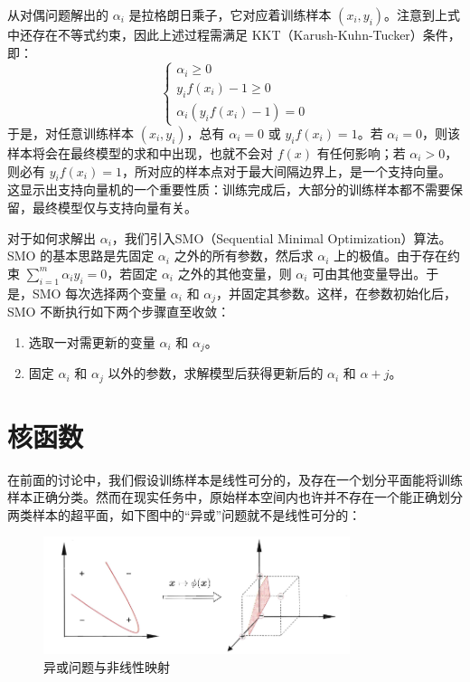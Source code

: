 \documentclass[12pt, a4paper]{article} %
\begin{document}
从对偶问题解出的 $\alpha_i$ 是拉格朗日乘子，它对应着训练样本 $(x_i, y_i)$。注意到上式中还存在不等式约束，因此上述过程需满足 KKT（Karush-Kuhn-Tucker）条件，即：
\begin{equation*}
    \left\{\begin{matrix}
    \alpha_i \ge 0  \\
    y_i f(x_i) - 1 \ge 0 \\
    \alpha_i (y_i f(x_i) - 1) = 0
    \end{matrix}\right.
\end{equation*}
于是，对任意训练样本 $(x_i, y_i)$，总有 $\alpha_i = 0$ 或 $y_i f(x_i) = 1$。若 $\alpha_i = 0$，则该样本将会在最终模型的求和中出现，也就不会对 $f(x)$ 有任何影响；若 $\alpha_i > 0$，则必有 $y_i f(x_i) = 1$，所对应的样本点对于最大间隔边界上，是一个支持向量。这显示出支持向量机的一个重要性质：训练完成后，大部分的训练样本都不需要保留，最终模型仅与支持向量有关。

对于如何求解出 $\alpha_i$，我们引入SMO（Sequential Minimal Optimization）算法。SMO 的基本思路是先固定 $\alpha_i$ 之外的所有参数，然后求 $\alpha_i$ 上的极值。由于存在约束 $\displaystyle \sum_{i = 1}^{m} \alpha_i y_i = 0$，若固定 $\alpha_i$ 之外的其他变量，则 $\alpha_i$ 可由其他变量导出。于是，SMO 每次选择两个变量 $\alpha_i$ 和 $\alpha_j$，并固定其参数。这样，在参数初始化后，SMO 不断执行如下两个步骤直至收敛：
\begin{enumerate}[\hspace*{2em} i.]
    \item 选取一对需更新的变量 $\alpha_i$ 和 $\alpha_j$。
    \item 固定 $\alpha_i$ 和 $\alpha_j$ 以外的参数，求解模型后获得更新后的 $\alpha_i$ 和 $\alpha+j$。
\end{enumerate}

\section{核函数}

在前面的讨论中，我们假设训练样本是线性可分的，及存在一个划分平面能将训练样本正确分类。然而在现实任务中，原始样本空间内也许并不存在一个能正确划分两类样本的超平面，如下图中的“异或”问题就不是线性可分的：

\begin{figure}[H]
    \centering
    \includegraphics[width=0.8\textwidth]{../img/6-3-异或问题与非线性映射.png}
    \caption{异或问题与非线性映射}
    \label{fig:异或问题与非线性映射}
\end{figure}
\end{document}
